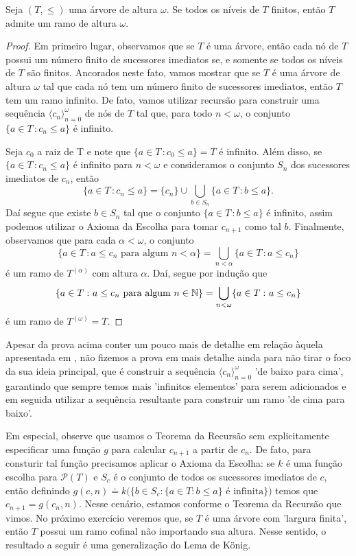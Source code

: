 \documentclass[a4paper]{article}
\begin{document}
  \begin{teo}
  Seja \((T,\leq)\) uma árvore de altura \(\omega\). Se todos os níveis de \(T\) finitos, então
  \(T\) admite um ramo de altura \(\omega\).
  \end{teo}
\begin{proof}
  Em primeiro lugar, observamos que se  \(T\) é uma árvore, então cada nó de \(T\) possui
  um número finito de sucessores imediatos se, e somente se todos os níveis de
  \(T\) são finitos. Ancorados neste fato, vamos mostrar que se \(T\) é uma
  árvore de altura \(\omega\) tal que cada nó tem um número finito de sucessores
  imediatos,  então \(T\) tem um ramo infinito. De fato, vamos utilizar recursão
  para  construir uma sequência \(\langle c_n\rangle_{n=0}^{\omega}\)  de nós de \(T\) tal que,
  para todo \(n<\omega\), o conjunto \(\{a\in T\,\colon c_n\leq a\}\) é
  infinito.

  Seja \(c_0\) a raiz de T e  note que \(\{a \in T\,\colon c_{0} \leq a \}= T\)
  é infinito. Além disso, se \(\{a\in T\,\colon c_n\leq a\}\) é infinito para
  \(n<\omega\) e consideramos  o
  conjunto \(S_n\) dos sucessores imediatos de \(c_n\), então
  \[
  \{a\in T\,\colon c_n\leq a\} = \{c_n\} \cup\bigcup_{b\in S_n} \{a\in T\,\colon b\leq a\}.
  \]
 Daí segue que existe \(b\in S_n\) tal que o conjunto \(\{a\in T\,\colon
 b\leq a\}\) é infinito, assim podemos utilizar o Axioma da Escolha para
 tomar \(c_{n+1}\) como tal \(b\). 
 Finalmente, observamos que para cada \(\alpha<\omega\), o conjunto
 \[\{a\in T\,\colon  a\leq c_n \text{ para algum }
   n<\alpha\}=\bigcup_{n<\alpha}\{a\in T\,\colon a\leq c_n\}\] é
  um ramo de \(T^{(\alpha)}\) com altura \(\alpha\). Daí,
  segue por indução que \[\{a\in T\,\colon a\leq c_n \text{ para algum }
    n\in\mathbb{N}\}=\bigcup_{n <\omega}\{a\in T\,\colon a\leq c_n\}\]
  é um ramo de \(T^{(\omega)}=T\).
  \end{proof}

    Apesar da prova acima conter um pouco mais de detalhe em relação àquela
    apresentada em \cite{jech}, não fizemos a prova em mais detalhe ainda para
    não tirar o foco da sua ideia principal, que é construir a sequência
    \(\langle c_n\rangle_{n=0}^\omega\) 'de baixo para cima', garantindo que
    sempre temos mais 'infinitos elementos' para serem adicionados e em seguida
    utilizar a sequência resultante para construir um ramo 'de cima para baixo'.

    Em especial, observe que usamos o Teorema da Recursão sem
    explicitamente especificar uma função \(g\) para
    calcular \(c_{n+1}\) a partir de \(c_n\). De fato, para consturir tal função precisamos
    aplicar o Axioma da Escolha: se \(k\) é uma função escolha para
    \(\mathcal{P}(T)\) e \(S_c\) é o conjunto de todos os sucessores imediatos
    de \(c\), então definindo \(g(c,n) \doteq k\big ( \{b\in S_c: \{a\in T: b\leq a\} \text{ é
      infinita}\}\big )\) temos que \(c_{n+1} = g(c_n, n)\). Nesse cenário, estamos
    conforme o Teorema da Recursão que vimos. No próximo exercício veremos que,
    se \(T\) é uma árvore com 'largura finita', então \(T\) possui um ramo
    cofinal não importando sua altura. Nesse sentido, o resultado a seguir é uma
    generalização do Lema de König.
  
\end{document}
